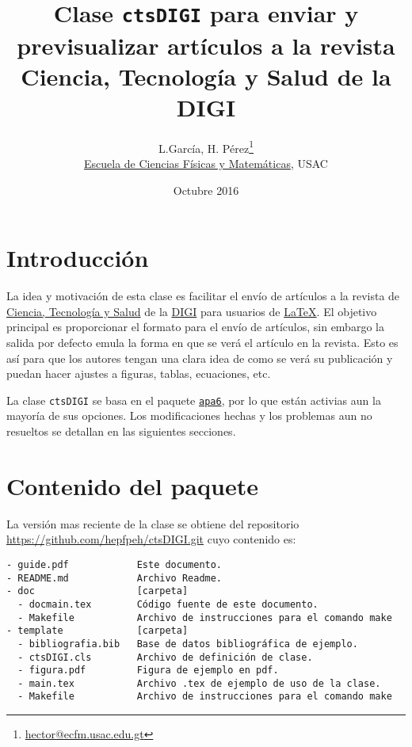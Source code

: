 \documentclass{article}
\title{Clase \texttt{ctsDIGI} para enviar y previsualizar artículos a la revista Ciencia, Tecnología y Salud de la DIGI}
\author{L.García, H. Pérez\footnote{\href{mailto:hector@ecfm.usac.edu.gt}{hector@ecfm.usac.edu.gt}}\\\small{\href{http://ecfm.usac.edu.gt}{Escuela de Ciencias Físicas y Matemáticas}, USAC}}
\date{Octubre 2016}
\begin{document}
\maketitle



\section{Introducción}
La idea y motivación de esta clase es facilitar el envío de artículos a la revista de \href{http://digi.usac.edu.gt/ojsrevistas/index.php/cytes}{Ciencia, Tecnología y Salud} de la \href{http://digi.usac.edu.gt/}{DIGI} para usuarios de \href{https://www.latex-project.org/}{\LaTeX}. 
El objetivo principal es proporcionar el formato para el envío de artículos, sin embargo la salida por defecto  emula la forma en que se verá el artículo en la revista. Esto es así para que los autores tengan una clara idea de como se verá su publicación y puedan hacer ajustes a figuras, tablas, ecuaciones, etc.

La clase \texttt{ctsDIGI} se basa en el paquete \href{https://www.ctan.org/pkg/apa6}{\texttt{apa6}}, por lo que están activias aun la mayoría de sus opciones. Los modificaciones hechas y los problemas aun no resueltos se detallan en las siguientes secciones.

\section{Contenido del paquete}
La versión mas reciente de la clase se obtiene del repositorio \href{https://github.com/hepfpeh/ctsDIGI.git}{https://github.com/hepfpeh/ctsDIGI.git} cuyo contenido es:
\begin{verbatim}
- guide.pdf            Este documento.
- README.md            Archivo Readme.
- doc                  [carpeta]
  - docmain.tex        Código fuente de este documento.
  - Makefile           Archivo de instrucciones para el comando make
- template             [carpeta]
  - bibliografia.bib   Base de datos bibliográfica de ejemplo.
  - ctsDIGI.cls        Archivo de definición de clase.
  - figura.pdf         Figura de ejemplo en pdf.           
  - main.tex           Archivo .tex de ejemplo de uso de la clase.
  - Makefile           Archivo de instrucciones para el comando make
\end{verbatim}
\end{document}
